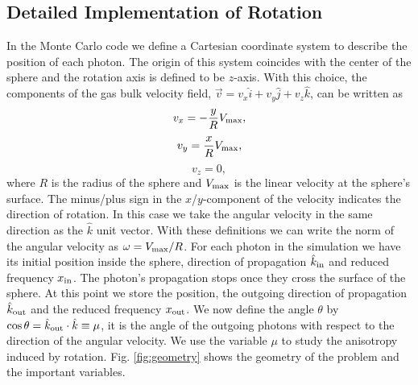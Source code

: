 \subsection{Detailed Implementation of Rotation}
In the Monte Carlo code we define a Cartesian coordinate system to
describe the position of each photon. The origin of this system
coincides with the center of the sphere and the rotation axis is defined
to be $z$-axis. With this choice, the components of the gas bulk velocity
field, $\vec{v} = v_{x}\hat{i} + v_{y}\hat{j} + v_{z}\hat{k}$, can be
written as
\begin{equation}
v_{x}=-\frac{y}{R}V_{\rm max}, \label{subeq1}
\end{equation}
\begin{equation}
v_{y}=\frac{x}{R}V_{\rm max}, \label{subeq2}
\end{equation}
\begin{equation}
v_{z}=0, \label{subeq3}
\end{equation}
%
where $R$ is the radius of the sphere and $V_{\rm max}$ is the linear
velocity at the sphere's surface. The minus/plus sign in the
$x$/$y$-component of the velocity indicates the direction of
rotation. In this case we take the angular velocity in the same
direction as the $\hat{k}$ unit vector. With these definitions we can
write the norm of the angular velocity as $\omega=V_{\rm max}/R$.
For each photon in the simulation we have its initial position inside
the sphere, direction of propagation $\hat{k}_{\rm in}$ and reduced
frequency $x_{\rm in}$.
The photon's propagation stops once they cross the
surface of the sphere. At this point we store the position, the outgoing direction
of propagation $\hat{k}_{\rm out}$ and the reduced frequency $x_{\rm
out}$. We now define the angle $\theta$ by $\cos\theta = \hat{k}_{\rm out}\cdot
\hat{k}\equiv \mu$, it is the angle of the outgoing photons with
respect to the direction of the angular velocity. We use the variable $\mu$ to
study the anisotropy induced by rotation. Fig. \ref{fig:geometry}
shows the geometry of the problem and the important variables.
